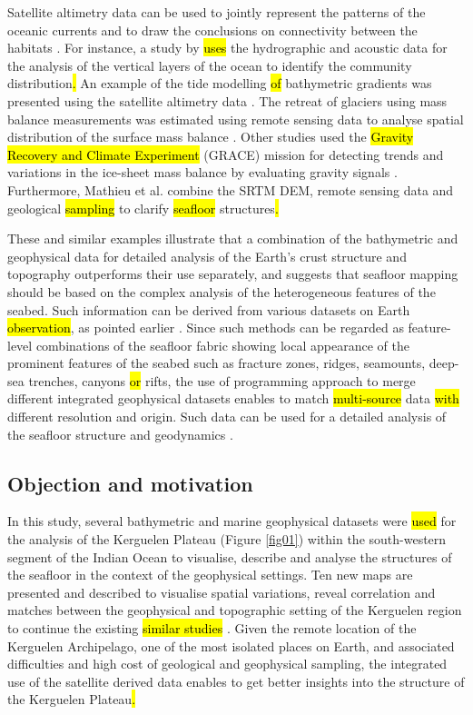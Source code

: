 \documentclass[geomatics,article,submit,pdftex,moreauthors]{Definitions/mdpi}
\begin{document}
Satellite altimetry data can be used to jointly represent the patterns of the oceanic currents and to draw the conclusions on\hl{ }connectivity between the habitats \cite{MORI201645}. For instance, a study by \cite{COTTE2022103650} \hl{ uses} the hydrographic and acoustic data\hl{ }for the analysis of the vertical layers of the ocean to identify the community distribution\hl{. }An example of the tide modelling \hl{of} bathymetric gradients was presented using the satellite altimetry data \cite{Maraldi}. The retreat of glaciers using mass balance measurements was estimated using remote sensing data to analyse spatial distribution of the surface mass balance \cite{Verfaillie}. Other studies used the \hl{Gravity Recovery and Climate Experiment} (GRACE) mission for detecting trends and variations in the ice-sheet mass balance by evaluating gravity signals \cite{YAMAMOTO2008267}. Furthermore, Mathieu et al. \cite{MATHIEU2011206} combine the SRTM DEM, remote sensing data and\hl{ }geological \hl{sampling} to clarify \hl{seafloor} structures\hl{.} 

These and similar examples illustrate that a combination of the bathymetric and geophysical data for detailed analysis of the Earth's crust structure and topography outperforms their use separately, and suggests that seafloor mapping should be based on the complex analysis of the heterogeneous features of the seabed. Such information can be derived from various datasets on Earth \hl{observation}, as pointed earlier \cite{COWLEY2004267,Lemenkova202125,1993A234,ABUAMARAH2019868}. Since such methods can be regarded as feature-level combinations of the seafloor fabric showing local appearance of the prominent features of the seabed such as fracture zones, ridges, seamounts, deep-sea trenches, canyons \hl{or} rifts,\hl{ }the use of\hl{ }programming approach to merge different integrated geophysical datasets enables to match \hl{multi-source} data\hl{ with }different resolution and origin. Such data can be used for a detailed analysis of the seafloor structure and geodynamics \cite{Veevers1991b,Lemenkova202104,Hill}. 

\subsection{Objection and motivation}

In this study, several bathymetric and marine geophysical datasets were \hl{used} for the analysis of the Kerguelen Plateau (Figure \ref{fig01})\hl{ }within the south-western segment of the Indian Ocean to visualise, describe and analyse the structures of the seafloor\hl{ }in the context of the geophysical settings.\hl{ }Ten new maps are presented and described to visualise spatial variations, reveal correlation and\hl{ }matches between the geophysical and topographic setting of the Kerguelen region to\hl{ }continue the existing \hl{similar studies} \cite{Nougier,Petit,RECQ1989133}. Given the remote location of the Kerguelen Archipelago, one of the most isolated places on Earth, and associated difficulties and high cost of geological and geophysical sampling, the integrated use of the satellite derived data enables to get better insights into the structure of the Kerguelen Plateau\hl{.}
\end{document}
